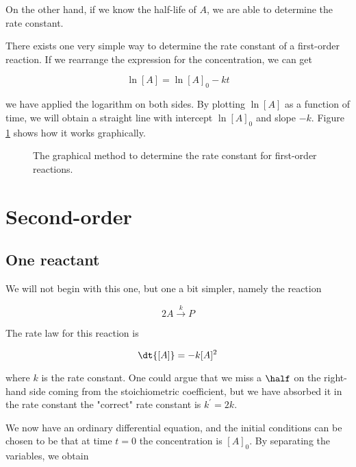 On the other hand, if we know the half-life of $A$, we are able to
determine the rate constant.

There exists one very simple way to determine the rate constant of a
first-order reaction. If we rearrange the expression for the
concentration, we can get

\begin{equation}
  \label{eq:firstOrderLinear}
  \ln[A] = \ln[A]_0 - kt
\end{equation}

\ie we have applied the logarithm on both sides. By plotting $\ln[A]$
as a function of time, we will obtain a straight line with intercept
$\ln[A]_0$ and slope $-k$. Figure \ref{fig:firstOrderLinear} shows how
it works graphically.

\begin{figure}
  \centering

  \caption{The graphical method to determine the rate constant for first-order reactions.}
  \label{fig:firstOrderLinear}
\end{figure}

\section{Second-order}
\label{sec:secondOrder}

\subsection{One reactant}
We will not begin with this one, but one a bit simpler, namely the reaction

\begin{equation}
  \label{eq:secondOrderSame}
  2A \overset{k}{\rightarrow} P
\end{equation}

The rate law for this reaction is

\begin{equation}
  \label{eq:secondOrderSameVelocity}
  \dt{[A]} = -k[A]^2
\end{equation}

where $k$ is the rate constant. One could argue that we miss a $\half$ on the right-hand side coming from the stoichiometric coefficient, but we have absorbed it in the rate constant \ie the "correct" rate constant is $k^\prime = 2k$.

We now have an ordinary differential equation, and the initial conditions can be chosen to be that at time $t = 0$ the concentration is $[A]_0$. By separating the variables, we obtain

